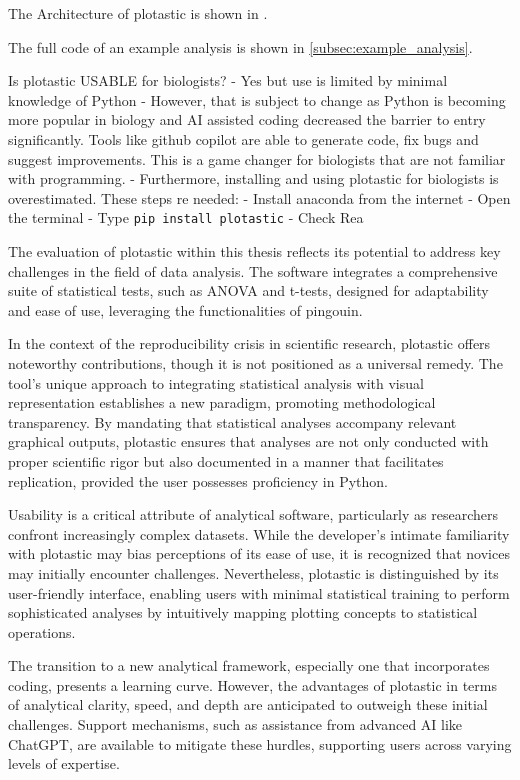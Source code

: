 The Architecture of plotastic is shown in .

The full code of an example analysis is shown in \autoref{subsec:example_analysis}.


Is plotastic USABLE for biologists?
- Yes but use is limited by minimal knowledge of Python
- However, that is subject to change as Python is becoming more popular
in biology and AI assisted coding decreased the barrier to entry
significantly. Tools like github copilot are able to generate code, fix
bugs and suggest improvements. This is a game changer for biologists
that are not familiar with programming.
- Furthermore, installing and using plotastic for biologists is overestimated. These
steps re needed:
- Install anaconda from the internet
- Open the terminal
- Type \texttt{pip install plotastic}
- Check Rea


The evaluation of plotastic within this thesis reflects its potential to address
key challenges in the field of data analysis. The software integrates a
comprehensive suite of statistical tests, such as ANOVA and t-tests, designed
for adaptability and ease of use, leveraging the functionalities of pingouin.

In the context of the reproducibility crisis in scientific research, plotastic
offers noteworthy contributions, though it is not positioned as a universal
remedy. The tool's unique approach to integrating statistical analysis with
visual representation establishes a new paradigm, promoting methodological
transparency. By mandating that statistical analyses accompany relevant
graphical outputs, plotastic ensures that analyses are not only conducted with
proper scientific rigor but also documented in a manner that facilitates
replication, provided the user possesses proficiency in Python.

Usability is a critical attribute of analytical software, particularly as
researchers confront increasingly complex datasets. While the developer's
intimate familiarity with plotastic may bias perceptions of its ease of use, it
is recognized that novices may initially encounter challenges. Nevertheless,
plotastic is distinguished by its user-friendly interface, enabling users with
minimal statistical training to perform sophisticated analyses by intuitively
mapping plotting concepts to statistical operations.

The transition to a new analytical framework, especially one that incorporates
coding, presents a learning curve. However, the advantages of plotastic in terms
of analytical clarity, speed, and depth are anticipated to outweigh these
initial challenges. Support mechanisms, such as assistance from advanced AI like
ChatGPT, are available to mitigate these hurdles, supporting users across
varying levels of expertise.

